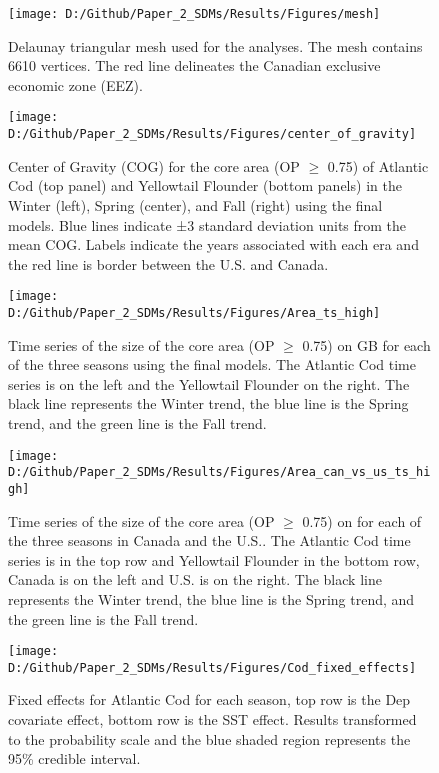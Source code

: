 \documentclass[
]{article}
\begin{document}
\clearpage
\begin{figure}
\texttt{[image: D:/Github/Paper\_2\_SDMs/Results/Figures/mesh]} \caption{Delaunay triangular mesh used for the analyses. The mesh contains 6610 vertices. The red line delineates the Canadian exclusive economic zone (EEZ).}\label{fig:Mesh}
\end{figure}

\begin{landscape}
\newpage
\begin{figure}
\texttt{[image: D:/Github/Paper\_2\_SDMs/Results/Figures/center\_of\_gravity]} \caption{Center of Gravity (COG) for the core area (OP $\geq$ 0.75) of Atlantic Cod (top panel) and Yellowtail Flounder (bottom panels) in the Winter (left), Spring (center), and Fall (right) using the final models.  Blue lines indicate ±3 standard deviation units from the mean COG. Labels indicate the years associated with each era and the red line is border between the U.S. and Canada.}\label{fig:cog-hep}
\end{figure}

\newpage
\begin{figure}
\texttt{[image: D:/Github/Paper\_2\_SDMs/Results/Figures/Area\_ts\_high]} \caption{Time series of the size of the core area (OP $\geq$ 0.75) on GB for each of the three seasons using the final models.  The Atlantic Cod time series is on the left and the Yellowtail Flounder on the right.  The black line represents the Winter trend, the blue line is the Spring trend, and the green line is the Fall trend.  }\label{fig:area-hep}
\end{figure}

\newpage
\begin{figure}
\texttt{[image: D:/Github/Paper\_2\_SDMs/Results/Figures/Area\_can\_vs\_us\_ts\_high]} \caption{Time series of the size of the core area (OP $\geq$ 0.75) on for each of the three seasons in Canada and the U.S..  The Atlantic Cod time series is in the top row and Yellowtail Flounder in the bottom row, Canada is on the left and U.S. is on the right.  The black line represents the Winter trend, the blue line is the Spring trend, and the green line is the Fall trend.  }\label{fig:area-can-vs-us-hep}
\end{figure}

\newpage
\begin{figure}
\texttt{[image: D:/Github/Paper\_2\_SDMs/Results/Figures/Cod\_fixed\_effects]} \caption{Fixed effects for Atlantic Cod for each season, top row is the Dep covariate effect, bottom row is the SST effect. Results transformed to the probability scale and the blue shaded region represents the 95\% credible interval.}\label{fig:cod-fe}
\end{figure}


\end{landscape}
\end{document}
